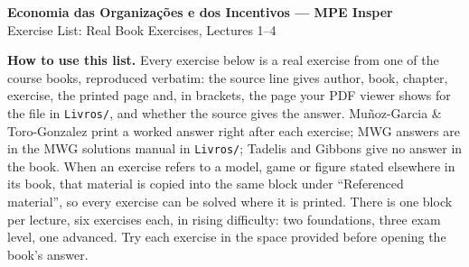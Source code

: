 \documentclass[11pt,a4paper]{article}
\newcommand{\disciplina}{Economia das Organizações e dos Incentivos --- MPE Insper}
\newcommand{\listatema}{Real Book Exercises, Lectures 1--4}
\begin{document}
\begin{center}
  {\Large\bfseries \disciplina}\\[2pt]
  {\large Exercise List: \listatema}
\end{center}

{\small\noindent\textbf{How to use this list.} Every exercise below is a real exercise from one of
the course books, reproduced verbatim: the source line gives author, book, chapter, exercise,
the printed page and, in brackets, the page your PDF viewer shows for the file in
\texttt{Livros/}, and whether the source gives the answer. Muñoz-Garcia \& Toro-Gonzalez print a
worked answer right after each exercise; MWG answers are in the MWG solutions manual in
\texttt{Livros/}; Tadelis and Gibbons give no answer in the book. When an exercise refers to a
model, game or figure stated elsewhere in its book, that material is copied into the same block
under ``Referenced material'', so every exercise can be solved where it is printed. There is one
block per lecture, six exercises each, in rising difficulty: two foundations, three exam level, one
advanced. Try each exercise in the space provided before opening the book's answer.\par}
\end{document}
